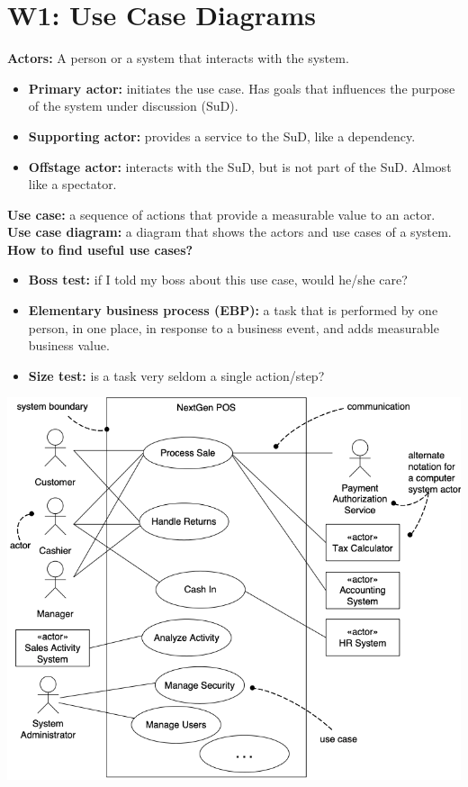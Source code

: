 \section{W1: Use Case Diagrams}
\textbf{Actors:} A person or a system that interacts with the system.\\
\begin{itemize}
    \item \textbf{Primary actor:} initiates the use case. Has goals that influences the purpose of the system under discussion (SuD).
    \item \textbf{Supporting actor:} provides a service to the SuD, like a dependency.
    \item \textbf{Offstage actor:} interacts with the SuD, but is not part of the SuD. Almost like a spectator.
\end{itemize}
\textbf{Use case:} a sequence of actions that provide a measurable value to an actor.\\
\textbf{Use case diagram:} a diagram that shows the actors and use cases of a system.\\
\textbf{How to find useful use cases?}
\begin{itemize}
    \item \textbf{Boss test:} if I told my boss about this use case, would he/she care?
    \item \textbf{Elementary business process (EBP):} a task that is performed by one person, in one place, in response to a business event, and adds measurable business value.
    \item \textbf{Size test:} is a task very seldom a single action/step?
\end{itemize}
\includegraphics[width=\linewidth]{figs/uml-use-case-diagram.png}